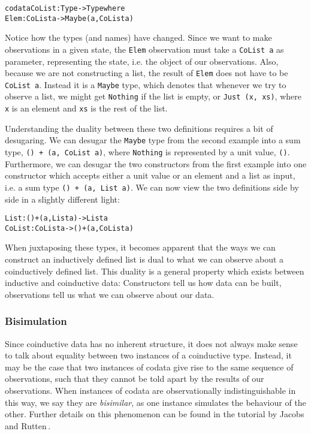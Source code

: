 \begin{alltt}
codata CoList : Type -> Type where
  Elem : CoList a -> Maybe (a, CoList a)
\end{alltt}



Notice how the types (and names) have changed. Since we want to make observations in a given state, the \texttt{Elem} observation must take a \texttt{CoList a} as parameter, representing the state, i.e. the object of our observations. Also, because we are not constructing a list, the result of \texttt{Elem} does not have to be \texttt{CoList~a}. Instead it is a \texttt{Maybe} type, which denotes that whenever we try to observe a list, we might get \texttt{Nothing} if the list is empty, or \texttt{Just (x, xs)}, where \texttt{x} is an element and \texttt{xs} is the rest of the list. 

Understanding the duality between these two definitions requires a bit of desugaring. We can desugar the \texttt{Maybe} type from the second example into a sum type, \texttt{() + (a, CoList a)}, where \texttt{Nothing} is represented by a unit value, \texttt{()}. Furthermore, we can desugar the two constructors from the first example into one constructor which accepts either a unit value or an element and a list as input, i.e. a sum type \texttt{() + (a, List a)}. We can now view the two definitions side by side in a slightly different light:

\begin{alltt}
List   : () + (a, List a)   ->   List a
CoList : CoList a           ->   () + (a, CoList a)
\end{alltt}

When juxtaposing these types, it becomes apparent that the ways we can construct an inductively defined list is dual to what we can observe about a coinductively defined list. This duality is a general property which exists between inductive and coinductive data: Constructors tell us how data can be built, observations tell us what we can observe about our data.

\subsubsection{Bisimulation}
Since coinductive data has no inherent structure, it does not always make sense to talk about equality between two instances of a coinductive type. Instead, it may be the case that two instances of codata give rise to the same sequence of observations, such that they cannot be told apart by the results of our observations. When instances of codata are observationally indistinguishable in this way, we say they are \emph{bisimilar}, as one instance simulates the behaviour of the other. Further details on this phenomenon can be found in the tutorial by Jacobs and Rutten\,\citep{Jacobs97atutorial}.

